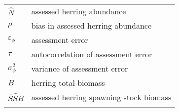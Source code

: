 \documentclass[]{article}
\begin{document}
\begin{longtable}[]{@{}ll@{}}
\begin{minipage}[t]{0.13\columnwidth}
\(\widehat{N}\)\strut
\end{minipage} & \begin{minipage}[t]{0.76\columnwidth}\raggedright\strut
assessed herring abundance\strut
\end{minipage}\tabularnewline
\begin{minipage}[t]{0.13\columnwidth}\raggedright\strut
\(\rho\)\strut
\end{minipage} & \begin{minipage}[t]{0.76\columnwidth}\raggedright\strut
bias in assessed herring abundance\strut
\end{minipage}\tabularnewline
\begin{minipage}[t]{0.13\columnwidth}\raggedright\strut
\(\varepsilon_{\phi}\)\strut
\end{minipage} & \begin{minipage}[t]{0.76\columnwidth}\raggedright\strut
assessment error\strut
\end{minipage}\tabularnewline
\begin{minipage}[t]{0.13\columnwidth}\raggedright\strut
\(\tau\)\strut
\end{minipage} & \begin{minipage}[t]{0.76\columnwidth}\raggedright\strut
autocorrelation of assessment error\strut
\end{minipage}\tabularnewline
\begin{minipage}[t]{0.13\columnwidth}\raggedright\strut
\(\sigma_{\phi}^2\)\strut
\end{minipage} & \begin{minipage}[t]{0.76\columnwidth}\raggedright\strut
variance of assessment error\strut
\end{minipage}\tabularnewline
\begin{minipage}[t]{0.13\columnwidth}\raggedright\strut
\(B\)\strut
\end{minipage} & \begin{minipage}[t]{0.76\columnwidth}\raggedright\strut
herring total biomass\strut
\end{minipage}\tabularnewline
\begin{minipage}[t]{0.13\columnwidth}\raggedright\strut
\(\widehat{SSB}\)\strut
\end{minipage} & \begin{minipage}[t]{0.76\columnwidth}\raggedright\strut
assessed herring spawning stock biomass\strut
\end{minipage}\tabularnewline
\begin{minipage}[t]{0.13\columnwidth}\raggedright\strut

\end{minipage}
\end{longtable}
\end{document}
